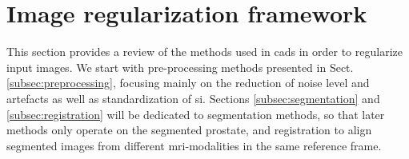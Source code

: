 \section{Image regularization framework} \label{sec:imaprocfra}

This section provides a review of the methods used in \acp{cad} in order to regularize input images. We start with pre-processing methods presented in Sect. \ref{subsec:preprocessing}, focusing mainly on the reduction of noise level and artefacts as well as standardization of \ac{si}. Sections \ref{subsec:segmentation} and \ref{subsec:registration} will be dedicated to segmentation methods, so that later methods only operate on the segmented prostate, and registration to align segmented images from different \ac{mri}-modalities in the same reference frame.






